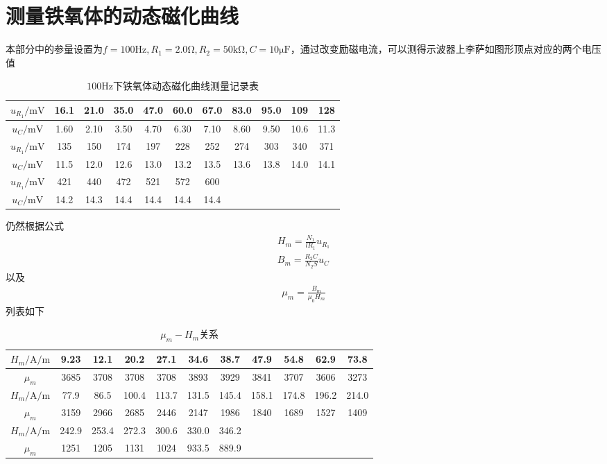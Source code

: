\documentclass{ctexart}
\begin{document}
	\section{测量铁氧体的动态磁化曲线}
	本部分中的参量设置为$f=100\mathrm{Hz},R_1=2.0\mathrm{\Omega},R_2=50\mathrm{k\Omega},C=10\mathrm{\mu F}$，通过改变励磁电流，可以测得示波器上李萨如图形顶点对应的两个电压值
	\begin{table}[H]
		\begin{center}
			\caption{$100\mathrm{Hz}$下铁氧体动态磁化曲线测量记录表}
			\begin{tabular}{c|cccccccccc}
				$u_{R_1}/\mathrm{mV}$ &16.1 &21.0 &35.0 &47.0 &60.0 &67.0 &83.0 &95.0 &109 &128 \\
				\hline
				$u_{C}/\mathrm{mV}$ &1.60 &2.10 &3.50 &4.70 &6.30 &7.10 &8.60 &9.50 &10.6 &11.3 \\
				\hline
				$u_{R_1}/\mathrm{mV}$ &135 &150 &174 &197 &228 &252 &274 &303 &340 &371 \\
				\hline
				$u_{C}/\mathrm{mV}$ &11.5 &12.0 &12.6 &13.0 &13.2 &13.5 &13.6 &13.8 &14.0 &14.1 \\
				\hline
				$u_{R_1}/\mathrm{mV}$&421&440&472&521&572&600&&&&\\
				\hline
				$u_{C}/\mathrm{mV}$&14.2&14.3&14.4&14.4&14.4&14.4&&&&
			\end{tabular}
		\end{center}
	\end{table}
	仍然根据公式
	\begin{align}
		H_m=\frac{N_1}{lR_1}u_{R_1}\\
		B_m=\frac{R_2C}{N_2S}u_C
	\end{align}
	以及
	\begin{align}
		\mu_m=\frac{B_m}{\mu_0H_m}
	\end{align}
	列表如下
		\begin{table}[H]
		\begin{center}
			\caption{$\mu_m-H_m$关系}
			\begin{tabular}{c|cccccccccc}
				$H_m/\mathrm{A/m}$&9.23&12.1
				&20.2				&27.1
				&34.6			&38.7
				&47.9				&54.8
				&62.9				&73.8
				\\ \hline
				$\mu_m$&3685&
				3708&
				3708&
				3708&
				3893&
				3929&
				3841&
				3707&
				3606&
				3273
				\\ \hline
				$H_m/\mathrm{A/m}$&
				77.9&
				86.5&
				100.4&
				113.7&
				131.5&
				145.4&
				158.1&
				174.8&
				196.2&
				214.0\\ \hline
				$\mu_m$&
				3159&
				2966&
				2685&
				2446&
				2147&
				1986&
				1840&
				1689&
				1527&
				1409\\ \hline
				$H_m/\mathrm{A/m}$&
				242.9&
				253.4&
				272.3&
				300.6&
				330.0&
				346.2&&&&\\ \hline
				$\mu_m$&
				1251&
				1205&
				1131&
				1024&
				933.5&
				889.9&&&&
			\end{tabular}
		\end{center}
	\end{table}
\end{document}
